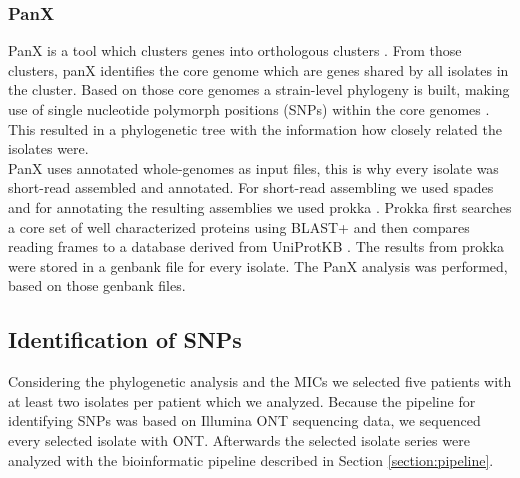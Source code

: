 \subsubsection{PanX}
PanX is a tool which clusters genes into orthologous clusters \cite{ding_panx:_2018}. From those clusters, panX identifies the core genome which are genes shared by all isolates in the cluster. Based on those core genomes a strain-level phylogeny is built, making use of single nucleotide polymorph positions (SNPs) within the core genomes \cite{ding_panx:_2018}. This resulted in a phylogenetic tree with the information how closely related the isolates were. \\ 
PanX uses annotated whole-genomes as input files, this is why every isolate was short-read assembled and annotated. For short-read assembling we used spades and for annotating the resulting assemblies we used prokka \cite{nurk_assembling_2013} \cite{seemann_prokka:_2014}. Prokka first searches a core set of well characterized proteins using BLAST+ and then compares reading frames to a database derived from UniProtKB \cite{seemann_prokka:_2014}. The results from prokka were stored in a genbank file for every isolate. The PanX analysis was performed, based on those genbank files. \\

\subsection{Identification of SNPs}
Considering the phylogenetic analysis and the MICs we selected five patients with at least two isolates per patient which we analyzed. Because the pipeline for identifying SNPs was based on Illumina ONT sequencing data, we sequenced every selected isolate with ONT. 
Afterwards the selected isolate series were analyzed with the bioinformatic pipeline described in Section \ref{section:pipeline}.
